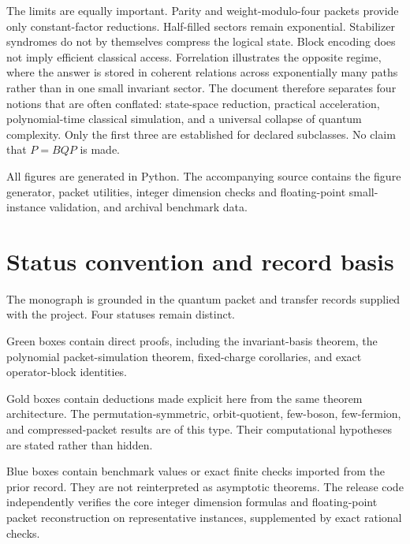 The limits are equally important. Parity and weight-modulo-four packets provide only constant-factor reductions. Half-filled sectors remain exponential. Stabilizer syndromes do not by themselves compress the logical state. Block encoding does not imply efficient classical access. Forrelation illustrates the opposite regime, where the answer is stored in coherent relations across exponentially many paths rather than in one small invariant sector. The document therefore separates four notions that are often conflated: state-space reduction, practical acceleration, polynomial-time classical simulation, and a universal collapse of quantum complexity. Only the first three are established for declared subclasses. No claim that $P=BQP$ is made.

All figures are generated in Python. The accompanying source contains the figure generator, packet utilities, integer dimension checks and floating-point small-instance validation, and archival benchmark data.

\chapter*{Status convention and record basis}
The monograph is grounded in the quantum packet and transfer records supplied with the project. Four statuses remain distinct.

\begin{provedbox}
Green boxes contain direct proofs, including the invariant-basis theorem, the polynomial packet-simulation theorem, fixed-charge corollaries, and exact operator-block identities.
\end{provedbox}

\begin{derivedbox}
Gold boxes contain deductions made explicit here from the same theorem architecture. The permutation-symmetric, orbit-quotient, few-boson, few-fermion, and compressed-packet results are of this type. Their computational hypotheses are stated rather than hidden.
\end{derivedbox}

\begin{recordbox}
Blue boxes contain benchmark values or exact finite checks imported from the prior record. They are not reinterpreted as asymptotic theorems. The release code independently verifies the core integer dimension formulas and floating-point packet reconstruction on representative instances, supplemented by exact rational checks.
\end{recordbox}

